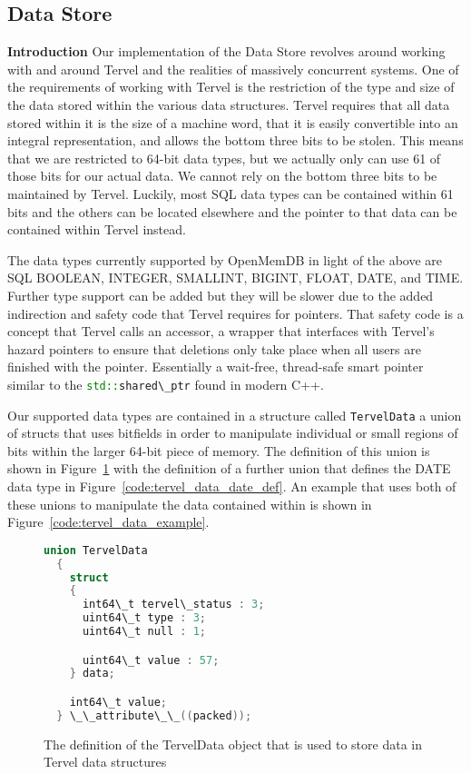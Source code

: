 \documentclass[letterpaper, 11pt]{article}
\newcommand{\inlinecode}[1]{\colorbox{codegrey}{\lstinline[language=C++]{#1}}}
\begin{document}
  \subsection{Data Store}
{\bfseries Introduction}
Our implementation of the Data Store revolves around working with and around Tervel and the
realities of massively concurrent systems. One of the requirements of working with Tervel is
the restriction of the type and size of the data stored within the various data structures.
Tervel requires that all data stored within it is the size of a machine word, that it is 
easily convertible into an integral representation, and allows the bottom three bits to be
stolen. This means that we are restricted to 64-bit data types, but we actually only can
use 61 of those bits for our actual data. We cannot rely on the bottom three bits to be 
maintained by Tervel. Luckily, most SQL data types can be contained within 61 bits and the 
others can be located elsewhere and the pointer to that data can be contained within Tervel
instead.
\par\vspace{\baselineskip}
The data types currently supported by OpenMemDB in light of the above are SQL BOOLEAN, 
INTEGER, SMALLINT, BIGINT, FLOAT, DATE, and TIME. Further type support can be added but they
will be slower due to the added indirection and safety code that Tervel requires for pointers.
That safety code is a concept that Tervel calls an accessor, a wrapper that interfaces with
Tervel's hazard pointers to ensure that deletions only take place when all users are finished
with the pointer. Essentially a wait-free, thread-safe smart pointer similar to the
\inlinecode{std::shared\_ptr} found in modern C++.
\par\vspace{\baselineskip}
Our supported data types are contained in a structure called \inlinecode{TervelData} a 
union of structs that uses bitfields in order to manipulate individual or small regions of
bits within the larger 64-bit piece of memory. The definition of this union is shown in
Figure~\ref{code:tervel_data_definition} with the definition of a further union that defines the 
DATE data type in Figure~\ref{code:tervel_data_date_def}. An example that uses both of these
unions to manipulate the data contained within is shown in Figure~\ref{code:tervel_data_example}.
\par\vspace{\baselineskip}
\begin{figure}
  \begin{lstlisting}[language=C++]
  union TervelData
  {
    struct 
    {
      int64\_t tervel\_status : 3;
      uint64\_t type : 3;
      uint64\_t null : 1;

      uint64\_t value : 57;
    } data;

    int64\_t value;
  } \_\_attribute\_\_((packed));
  \end{lstlisting}

  \caption{The definition of the TervelData object that is used to store data in Tervel data structures}
  \label{code:tervel_data_definition}
\end{figure}
\end{document}
